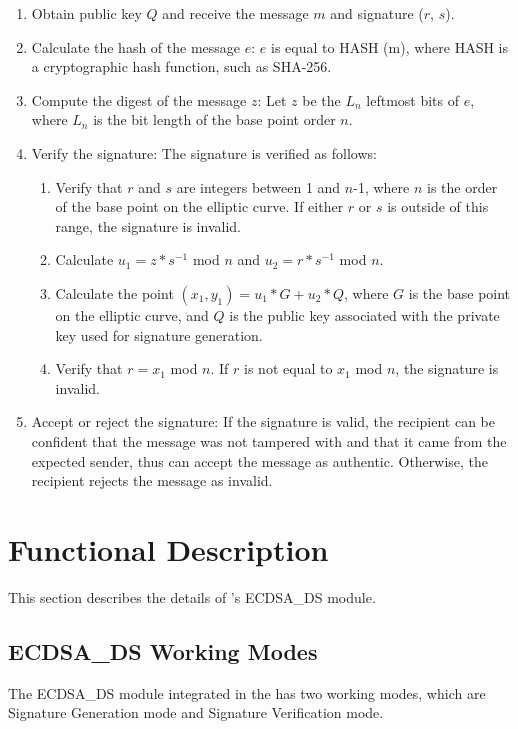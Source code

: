 \documentclass[main\_\_EN.tex]{subfiles}
\begin{document}
\begin{enumerate}
    \item Obtain public key $Q$ and receive the message $m$ and signature ($r$, $s$).
    \item Calculate the hash of the message $e$: $e$ is equal to HASH (m), where HASH is a cryptographic hash function, such as SHA-256.
    \item Compute the digest of the message $z$: Let $z$ be the $L_n$ leftmost bits of $e$, where $L_n$ is the bit length of the base point order $n$.
    \item Verify the signature: The signature is verified as follows:
        \begin{enumerate}
            \item Verify that $r$ and $s$ are integers between 1 and $n$-1, where $n$ is the order of the base point on the elliptic curve. If either $r$ or $s$ is outside of this range, the signature is invalid.
            \item Calculate $u_1 = z * s^{-1}$ mod $n$ and $u_2 = r * s^{-1}$ mod $n$.
            \item Calculate the point $(x_1, y_1) = u_1 * G + u_2 * Q$, where $G$ is the base point on the elliptic curve, and $Q$ is the public key associated with the private key used for signature generation.
            \item Verify that $r = x_1$ \textrm{mod} $n$. If $r$ is not equal to $x_1$ mod $n$, the signature is invalid.
        \end{enumerate}
    \item Accept or reject the signature: If the signature is valid, the recipient can be confident that the message was not tampered with and that it came from the expected sender, thus can accept the message as authentic. Otherwise, the recipient rejects the message as invalid.
\end{enumerate}


\section{Functional Description}

This section describes the details of \chipname{}'s ECDSA\_DS module.

\subsection{ECDSA\_DS Working Modes}

The ECDSA\_DS module integrated in the \chipname{} has two working modes, which are Signature Generation mode and Signature Verification mode.
\end{document}
